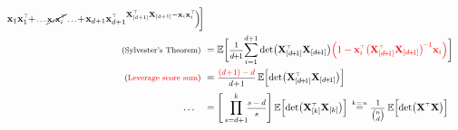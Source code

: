 \documentclass{beamer}
\begin{document}
\begin{frame}
{\begin{align*}
{\x_{1}\x_{1}^\top\!\!+\!\text{\fontsize{8}{8}\selectfont$\dots
\cancel{\x_{i}\x_{i}^\top}\dots $}\!\!+\!\x_{{d+1}}\x_{{d+1}}^\top }^{\X_{[d+1]}^{\top}\X_{[d+1]}-\x_{i}\x_{i}^\top}\!\Big)\!\bigg]\\
\hspace{-9mm}\text{\fontsize{8}{8}\selectfont(Sylvester's Theorem)}\ 
&=\E\bigg[\text{\fontsize{8}{8}\selectfont$\frac{1}{d\!\!+\!\!1}$}\!
\sum_{i=1}^{d+1} 
\det\!\big(\X_{[d\!+\!1]}^{\top}\X_{[d\!+\!1]}\big)\Red{\Big(1 - \x_{i}^\top\big(\X_{[d\!+\!1]}^{\top}\X_{[d\!+\!1]}\big)^{\!-1}
\x_{i}\Big)}\bigg]\\
\hspace{-9mm}\text{\fontsize{8}{8}\selectfont(\Red{Leverage score sum})}\ &=
\text{\fontsize{8}{8}\selectfont$\frac{\Red{(d\!+\!1) - d}}{d\!+\!1}$} \,\E\Big[\!\det\!\big(\X_{[d\!+\!1]}^{\top}\X_{[d\!+\!1]}\big) \Big]\\[0.7mm]
\dots\quad &=\Bigg[\prod_{s=d+1}^k \!\!\text{\fontsize{8}{8}\selectfont$\frac{s-d}{s}$}\Bigg]
\,\E\Big[\!\det\!\big(\X_{[k]}^{\top}\X_{[k]}\big) \Big]
\, \overset{\text{\fontsize{6}{6}\selectfont$k\!=\!n$}}{=} \text{\fontsize{8}{8}\selectfont$\frac{1}{{n\choose d}}$} \,\E\Big[\!\det\!\big(\X^{\top}\X\big)\Big] %
\end{align*}
}
\only<9>{
\vspace{3.25mm}
\begin{align*}
\hspace{-3.25mm}\E\Big[
F\big(\X_{[k]}\big)\Big]
\quad\, &=\quad\,
\text{\fontsize{8}{8}\selectfont$\frac{1}{k\!\!+\!\!1}$}\!\sum_{i=1}^{k+1}
\E\Big[F\big(\X_{[k\!+\!1]-i}\big)\Big]\\
&=\quad\,
\E\bigg[\text{\fontsize{8}{8}\selectfont$\frac{1}{k\!\!+\!\!1}$} \Red{\sum_{i=1}^{k+1}
F\big(\X_{[k\!+\!1]-i}\big)}\bigg]\\
 \hspace{-3.25mm}\text{\fontsize{8}{8}\selectfont(\Red{$d$-modularity})}\quad
        &=
\text{\fontsize{8}{8}\selectfont$\frac{\Red{(k\!+\!1) - d}}{k\!+\!1}$} \,\E\Big[
\Red{F\big(\X_{[k\!+\!1]}\big)} \Big]\\[1.1mm]
\dots\quad &=\Bigg[\prod_{s=k+1}^n \!\!\text{\fontsize{8}{8}\selectfont$\frac{s-d}{s}$}\Bigg]
\,\E\Big[F\big(\X_{[n]}\big) \Big]
\hspace{4.05cm}~ %
\end{align*}
}
\end{frame}
\end{document}
